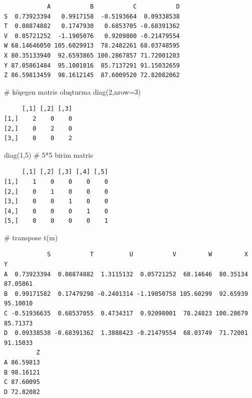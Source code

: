 \documentclass[
  letterpaper,
  DIV=11,
  numbers=noendperiod]{scrreprt}
\newenvironment{Shaded}{\begin{snugshade}}{\end{snugshade}}
\newcommand{\AttributeTok}[1]{\textcolor[rgb]{0.40,0.45,0.13}{#1}}
\newcommand{\CommentTok}[1]{\textcolor[rgb]{0.37,0.37,0.37}{#1}}
\newcommand{\DecValTok}[1]{\textcolor[rgb]{0.68,0.00,0.00}{#1}}
\newcommand{\FunctionTok}[1]{\textcolor[rgb]{0.28,0.35,0.67}{#1}}
\newcommand{\NormalTok}[1]{\textcolor[rgb]{0.00,0.23,0.31}{#1}}
\begin{document}
\begin{verbatim}
            A           B           C           D
S  0.73923394   0.9917158  -0.5193664  0.09338538
T  0.08874882   0.1747930   0.6853705 -0.68391362
V  0.05721252  -1.1905076   0.9209800 -0.21479554
W 68.14646050 105.6029913  78.2482261 68.03748595
X 80.35133940  92.6593865 100.2867857 71.72001203
Y 87.05861484  95.1001016  85.7137291 91.15032659
Z 86.59813459  98.1612145  87.6009520 72.82082062
\end{verbatim}

\begin{Shaded}
\begin{Highlighting}[]
\CommentTok{\# köşegen matris oluşturma}
\FunctionTok{diag}\NormalTok{(}\DecValTok{2}\NormalTok{,}\AttributeTok{nrow=}\DecValTok{3}\NormalTok{)}
\end{Highlighting}
\end{Shaded}

\begin{verbatim}
     [,1] [,2] [,3]
[1,]    2    0    0
[2,]    0    2    0
[3,]    0    0    2
\end{verbatim}

\begin{Shaded}
\begin{Highlighting}[]
\FunctionTok{diag}\NormalTok{(}\DecValTok{1}\NormalTok{,}\DecValTok{5}\NormalTok{) }\CommentTok{\# 5*5 birim matris}
\end{Highlighting}
\end{Shaded}

\begin{verbatim}
     [,1] [,2] [,3] [,4] [,5]
[1,]    1    0    0    0    0
[2,]    0    1    0    0    0
[3,]    0    0    1    0    0
[4,]    0    0    0    1    0
[5,]    0    0    0    0    1
\end{verbatim}

\begin{Shaded}
\begin{Highlighting}[]
\CommentTok{\# transpose}
\FunctionTok{t}\NormalTok{(m)}
\end{Highlighting}
\end{Shaded}

\begin{verbatim}
            S           T          U           V         W         X        Y
A  0.73923394  0.08874882  1.3115132  0.05721252  68.14646  80.35134 87.05861
B  0.99171582  0.17479298 -0.2401314 -1.19050758 105.60299  92.65939 95.10010
C -0.51936635  0.68537055  0.4734317  0.92098001  78.24823 100.28679 85.71373
D  0.09338538 -0.68391362  1.3888423 -0.21479554  68.03749  71.72001 91.15033
         Z
A 86.59813
B 98.16121
C 87.60095
D 72.82082
\end{verbatim}
\end{document}
